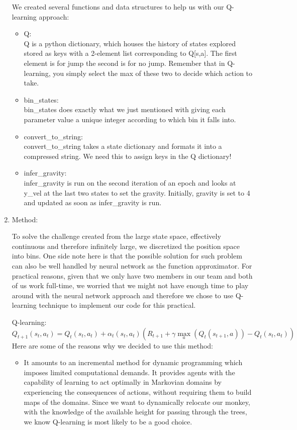 \documentclass[12pt]{article}
\newcommand\tab[1][0.5cm]{\hspace*{#1}}
\begin{document}
\begin{enumerate}
We created several functions and data structures to help us with our Q-learning approach:

\begin{itemize}
	\item Q: \\
		\tab Q is a python dictionary, which houses the history of states explored stored as keys with a 2-element list corresponding to Q[s,a].  The first element is for jump the second is for no jump.  Remember that in Q-learning, you simply select the max of these two to decide which action to take.
	
	\item bin\_states: \\
	\tab bin\_states does exactly what we just mentioned with giving each parameter value a unique integer according to which bin it falls into.

	\item convert\_to\_string: \\
	\tab convert\_to\_string takes a state dictionary and formats it into a compressed string.  We need this to assign keys in the Q dictionary!

	\item infer\_gravity: \\
		\tab infer\_gravity is run on the second iteration of an epoch and looks at y\_vel at the last two states to set the gravity.  Initially, gravity is set to 4 and updated as soon as infer\_gravity is run.
\end{itemize}

\item
Method:

	\tab To solve the challenge created from the large state space, effectively continuous and therefore infinitely large, we discretized the position space into bins. One side note here is that the possible solution for such problem can also be well handled by neural network as the function approximator.  For practical reasons, given that we only have two members in our team and both of us work full-time, we worried that we might not have enough time to play around with the neural network approach and therefore we chose to use Q-learning technique to implement our code for this practical. 
	
	Q-learning:
	$$
	Q_{t+1}(s_t,a_t) = Q_{t}(s_t,a_t) + \alpha_{t}(s_t,a_t) (R_{t+1} + \gamma \max_{a}(Q_t(s_{t+1},a)) - Q_{t}(s_t,a_t))
	$$
	Here are some of the reasons why we decided to use this method:
\begin{itemize}
	\item 
		 It amounts to an incremental method for dynamic programming which imposes limited computational demands. It provides agents with the capability of learning to act optimally in Markovian domains by experiencing the consequences of actions, without requiring them to build maps of the domains. Since we want to dynamically relocate our monkey, with the knowledge of the available height for passing through the trees, we know Q-learning is most likely to be a good choice.\\
	

\end{itemize}
\end{enumerate}
\end{document}
